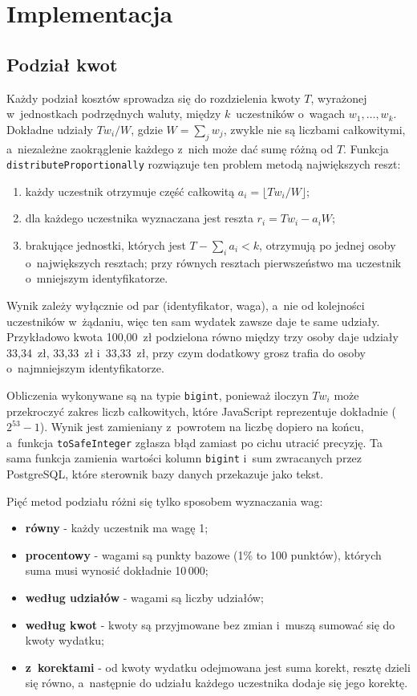 \section{Implementacja}

\subsection{Podział kwot}
\label{sec:podzial-kwot}

Każdy podział kosztów sprowadza się do rozdzielenia kwoty $T$, wyrażonej w~jednostkach podrzędnych waluty, między $k$~uczestników o~wagach $w_1, \dots, w_k$. Dokładne udziały $T w_i / W$, gdzie $W = \sum_j w_j$, zwykle nie są liczbami całkowitymi, a~niezależne zaokrąglenie każdego z~nich może dać sumę różną od $T$. Funkcja \texttt{distributeProportionally} rozwiązuje ten problem metodą największych reszt:

\begin{enumerate}
  \item każdy uczestnik otrzymuje część całkowitą $a_i = \lfloor T w_i / W \rfloor$;
  \item dla każdego uczestnika wyznaczana jest reszta $r_i = T w_i - a_i W$;
  \item brakujące jednostki, których jest $T - \sum_i a_i < k$, otrzymują po jednej osoby o~największych resztach; przy równych resztach pierwszeństwo ma uczestnik o~mniejszym identyfikatorze.
\end{enumerate}

Wynik zależy wyłącznie od par (identyfikator, waga), a~nie od kolejności uczestników w~żądaniu, więc ten sam wydatek zawsze daje te same udziały. Przykładowo kwota 100,00~zł podzielona równo między trzy osoby daje udziały 33,34~zł, 33,33~zł i~33,33~zł, przy czym dodatkowy grosz trafia do osoby o~najmniejszym identyfikatorze.

Obliczenia wykonywane są na typie \texttt{bigint}, ponieważ iloczyn $T w_i$ może przekroczyć zakres liczb całkowitych, które JavaScript reprezentuje dokładnie ($2^{53}-1$). Wynik jest zamieniany z~powrotem na liczbę dopiero na końcu, a~funkcja \texttt{toSafeInteger} zgłasza błąd zamiast po cichu utracić precyzję. Ta sama funkcja zamienia wartości kolumn \texttt{bigint} i~sum zwracanych przez PostgreSQL, które sterownik bazy danych przekazuje jako tekst.

Pięć metod podziału różni się tylko sposobem wyznaczania wag:

\begin{itemize}
  \item \textbf{równy} - każdy uczestnik ma wagę 1;
  \item \textbf{procentowy} - wagami są punkty bazowe (1\% to 100 punktów), których suma musi wynosić dokładnie 10\,000;
  \item \textbf{według udziałów} - wagami są liczby udziałów;
  \item \textbf{według kwot} - kwoty są przyjmowane bez zmian i~muszą sumować się do kwoty wydatku;
  \item \textbf{z~korektami} - od kwoty wydatku odejmowana jest suma korekt, resztę dzieli się równo, a~następnie do udziału każdego uczestnika dodaje się jego korektę.
\end{itemize}

